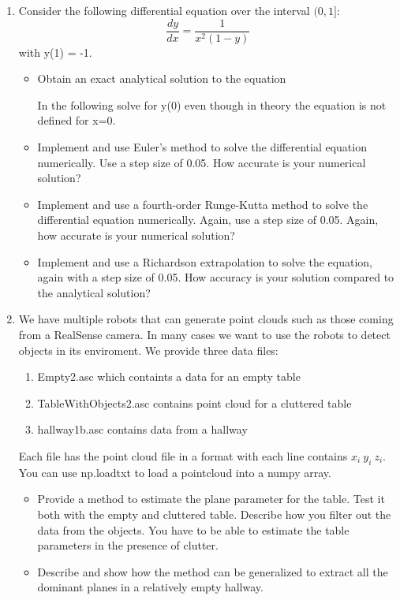 \documentclass[12pt]{article}
\begin{document}
\begin{enumerate}
 
\item Consider the following differential equation over the interval
  $(0, 1]$:
\[
\frac{dy}{dx} = \frac{1}{x^2(1-y)}
\]
with y(1) = -1. 

\begin{itemize}
\item Obtain an exact analytical solution to the equation

In the following solve for y(0) even though in theory the equation is
not defined for x=0. 

\item Implement and use Euler’s method to solve the differential
  equation numerically. Use a step size of 0.05. How accurate is your
  numerical solution?

\item Implement and use a fourth-order Runge-Kutta method to solve the
  differential equation numerically. Again, use a step size of
  0.05. Again, how accurate is your numerical solution? 

\item Implement and use a Richardson extrapolation to solve the
  equation, again with a step size of 0.05. How accuracy is your
  solution compared to the analytical solution? 
\end{itemize}

\item We have multiple robots that can generate point clouds such as
  those coming from a RealSense camera. In many cases we want to use the 
  robots to detect objects in its enviroment. We provide three data
  files:
  \begin{enumerate}
  \item Empty2.asc which containts a data for an empty table
  \item TableWithObjects2.asc contains point cloud for a cluttered table
  \item hallway1b.asc contains data from a hallway
  \end{enumerate}
  Each file has the point cloud file in a format with each line
  contains $x_i ~ y_i ~ z_i$. You can use np.loadtxt to load a pointcloud into a numpy array.
  \begin{itemize}
  \item Provide a method to estimate the plane parameter for the
    table. Test it both with the empty and cluttered table. Describe
    how you filter out the data from the objects. You have to be able
    to estimate the table parameters in the presence of clutter. 
  \item Describe and show how the method can be generalized to extract
    all the dominant planes in a relatively empty hallway. 
  \end{itemize}
\end{enumerate}
\end{document}
